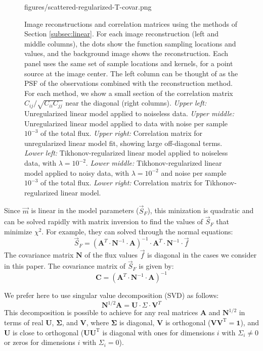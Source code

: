 \documentclass[twocolumn,tighten]{aastex61}
\begin{document}
\begin{figure}[t!]
                {figures/scattered-regularized-T-covar.png}
\caption{ \label{fig:scattered-linear} Image reconstructions and
  correlation matrices using the methods of Section
  \ref{subsec:linear}. For each image reconstruction (left and middle
  columns), the dots show the function sampling locations and values,
  and the background image shows the reconstruction. Each panel uses
  the same set of sample locations and kernels, for a point source at
  the image center. The left column can be thought of as the PSF of
  the observations combined with the reconstruction method. For each
  method, we show a small section of the
  correlation matrix $C_{ij}/\sqrt{C_{ii} C_{jj}}$ near the diagonal
  (right columns).
  {\it Upper left:} Unregularized linear model applied to noiseless
  data. {\it Upper middle:} Unregularized linear model applied to data
  with noise per sample $10^{-3}$ of the total flux. {\it Upper
    right:} Correlation matrix for unregularized linear model fit,
  showing large off-diagonal terms. {\it Lower left:}
  Tikhonov-regularized linear model applied to noiseless data, with
  $\lambda=10^{-2}$.  {\it Lower middle:} Tikhonov-regularized linear
  model applied to noisy data, with $\lambda=10^{-2}$ and noise per
  sample $10^{-3}$ of the total flux.  {\it Lower right:} Correlation
  matrix for Tikhonov-regularized linear model.}
\end{figure}

Since $\vec{m}$ is linear in the model parameters ($\vec{S}_F$), this
minization is quadratic and can be solved rapidly with matrix
inversion to find the values of $\vec{S}_F$ that minimize $\chi^2$.
For example, they can solved through the normal equations:
\begin{equation}
\vec{S}_F = \left(\mathbf{A}^T \cdot \mathbf{N}^{-1} \cdot
\mathbf{A}\right)^{-1}
\cdot \mathbf{A}^T \cdot \mathbf{N}^{-1} \cdot \vec{f}
\end{equation}
The covariance matrix $\mathbf{N}$ of the flux values $\vec{f}$ is
diagonal in the cases we consider in this paper. The covariance matrix
of $\vec{S}_F$ is given by:
\begin{equation}
\mathbf{C} = \left(\mathbf{A}^T \cdot \mathbf{N}^{-1} \cdot
\mathbf{A}\right)^{-1}
\end{equation}

We prefer here to use singular value decomposition (SVD) as follows:
\begin{equation}
  {\mathbf N}^{1/2} {\mathbf A} = {\mathbf U} \cdot \Sigma \cdot {\mathbf V}^T
\end{equation}
This decomposition is possible to achieve for any real matrices
$\mathbf{A}$ and $\mathbf{N}^{1/2}$ in terms of real $\mathbf{U}$,
$\mathbf{\Sigma}$, and $\mathbf{V}$, 
where $\mathbf{\Sigma}$ is diagonal, $\mathbf{V}$ is 
orthogonal ($\mathbf{V}\mathbf{V}^\mathrm{T} = \mathbf{1}$), and 
$\mathbf{U}$ is close to orthogonal
($\mathbf{U}\mathbf{U}^\mathrm{T}$ is diagonal with
ones for dimensions $i$ with $\Sigma_{i} \ne 0$
or zeros for dimensions $i$ with 
$\Sigma_i=0$).
\end{document}
